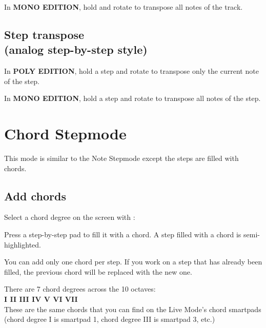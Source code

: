 In \textbf{MONO EDITION}, hold  and rotate \encodericon{} to transpose all notes of the track.


\subsection{Step transpose\\(analog step-by-step style)}

In \textbf{POLY EDITION}, hold a step \padsicon{} and rotate \encodericon{} to transpose only the current note of the step.


In \textbf{MONO EDITION}, hold a step \padsicon{} and rotate \encodericon{} to transpose all notes of the step.




\section{Chord Stepmode}

This mode is similar to the Note Stepmode except the steps are filled with chords.

\subsection{Add chords}

Select a chord degree on the screen with \encodericon{}:



Press a step-by-step pad \padsicon{} to fill it with a chord. A step filled with a chord is semi-highlighted.


You can add only one chord per step. If you work on a step that has already been filled, the previous chord will be replaced with the new one.

There are 7 chord degrees across the 10 octaves:\\
\textbf{I  II  III  IV  V  VI  VII}\\
These are the same chords that you can find on the Live Mode's chord smartpads (chord degree I is smartpad 1, chord degree III is smartpad 3, etc.)

